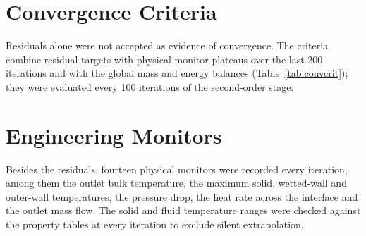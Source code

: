 

\section{Convergence Criteria}
Residuals alone were not accepted as evidence of convergence. The criteria combine residual targets with physical-monitor plateaus over the
last 200 iterations and with the global mass and energy balances (Table~\ref{tab:convcrit}); they were evaluated every 100 iterations of the
second-order stage.



\section{Engineering Monitors}
Besides the residuals, fourteen physical monitors were recorded every iteration, among them the outlet bulk temperature, the maximum solid,
wetted-wall and outer-wall temperatures, the pressure drop, the heat rate across the interface and the outlet mass flow. The solid and fluid
temperature ranges were checked against the property tables at every iteration to exclude silent extrapolation.
